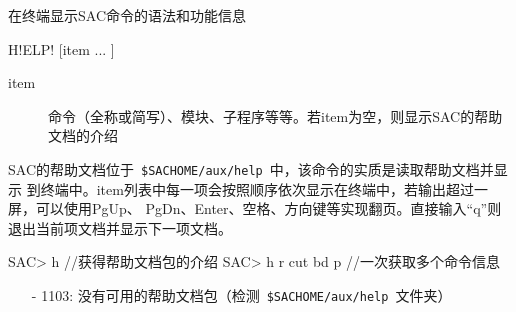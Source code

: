 \label{cmd:help}

在终端显示SAC命令的语法和功能信息

\begin{SACSTX}
H!ELP! [item ... ]
\end{SACSTX}

\begin{description}
\item [item] 命令（全称或简写）、模块、子程序等等。若item为空，则显示SAC的帮助文档的介绍
\end{description}

SAC的帮助文档位于~\verb+$SACHOME/aux/help+~中，该命令的实质是读取帮助文档并显示
到终端中。item列表中每一项会按照顺序依次显示在终端中，若输出超过一屏，可以使用PgUp、
PgDn、Enter、空格、方向键等实现翻页。直接输入``q''则退出当前项文档并显示下一项文档。

\begin{SACCode}
SAC> h                  //获得帮助文档包的介绍
SAC> h r cut bd p       //一次获取多个命令信息
\end{SACCode}

\begin{itemize}
\item[-]1103: 没有可用的帮助文档包（检测~\verb+$SACHOME/aux/help+~文件夹）
\end{itemize}
